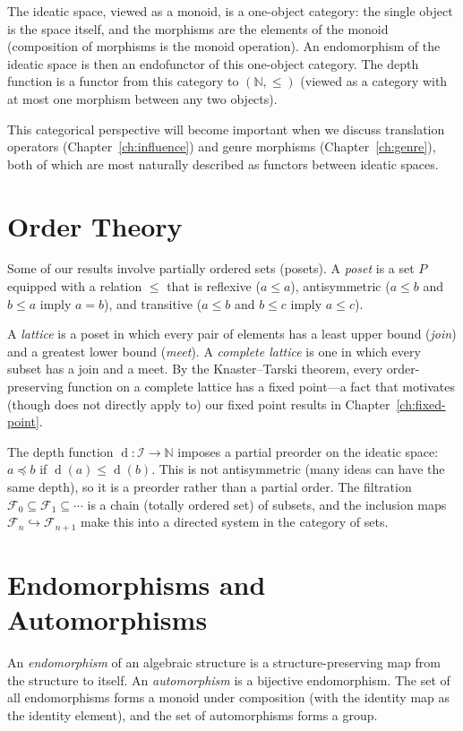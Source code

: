 \documentclass[11pt,openany]{book}
\theoremstyle{definition}
\theoremstyle{plain}
\theoremstyle{remark}
\newcommand{\IS}{\mathcal{I}}               %
\newcommand{\depth}{\operatorname{d}}       %
\newcommand{\Filt}[1]{\mathcal{F}_{#1}}     %
\begin{document}
The ideatic space, viewed as a monoid, is a one-object category: the single object is the space itself, and the morphisms are the elements of the monoid (composition of morphisms is the monoid operation). An endomorphism of the ideatic space is then an endofunctor of this one-object category. The depth function is a functor from this category to $(\mathbb{N}, \leq)$ (viewed as a category with at most one morphism between any two objects).

This categorical perspective will become important when we discuss translation operators (Chapter~\ref{ch:influence}) and genre morphisms (Chapter~\ref{ch:genre}), both of which are most naturally described as functors between ideatic spaces.

\section{Order Theory}

Some of our results involve partially ordered sets (posets). A \emph{poset} is a set $P$ equipped with a relation $\leq$ that is reflexive ($a \leq a$), antisymmetric ($a \leq b$ and $b \leq a$ imply $a = b$), and transitive ($a \leq b$ and $b \leq c$ imply $a \leq c$).

A \emph{lattice} is a poset in which every pair of elements has a least upper bound (\emph{join}) and a greatest lower bound (\emph{meet}). A \emph{complete lattice} is one in which every subset has a join and a meet. By the Knaster--Tarski theorem, every order-preserving function on a complete lattice has a fixed point---a fact that motivates (though does not directly apply to) our fixed point results in Chapter~\ref{ch:fixed-point}.

The depth function $\depth : \IS \to \mathbb{N}$ imposes a partial preorder on the ideatic space: $a \preceq b$ if $\depth(a) \leq \depth(b)$. This is not antisymmetric (many ideas can have the same depth), so it is a preorder rather than a partial order. The filtration $\Filt{0} \subseteq \Filt{1} \subseteq \cdots$ is a chain (totally ordered set) of subsets, and the inclusion maps $\Filt{n} \hookrightarrow \Filt{n+1}$ make this into a directed system in the category of sets.

\section{Endomorphisms and Automorphisms}

An \emph{endomorphism} of an algebraic structure is a structure-preserving map from the structure to itself. An \emph{automorphism} is a bijective endomorphism. The set of all endomorphisms forms a monoid under composition (with the identity map as the identity element), and the set of automorphisms forms a group.
\end{document}
